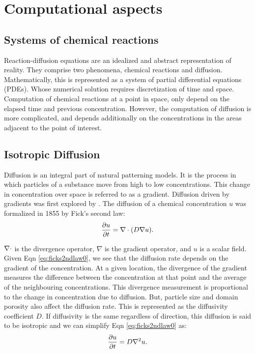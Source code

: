 \newcommand{\Morph}{u}

\chapter{Computational aspects}

\section{Systems of chemical reactions}
Reaction-diffusion equations are an idealized and abstract representation of reality. They comprise two phenomena, chemical reactions and diffusion. Mathematically, this is represented as a system of partial differential equations (PDEs). Whose numerical solution requires discretization of time and space. Computation of chemical reactions at a point in space, only depend on the elapsed time and previous concentration. However, the computation of diffusion is more complicated, and depends additionally on the concentrations in the areas adjacent to the point of interest.

\section{Isotropic Diffusion}
Diffusion is an integral part of natural patterning models. It is the process in which particles of a substance move from high to low concentrations. This change in concentration over space is referred to as a gradient. Diffusion driven by gradients was first explored by \citet{fick1995liquid}. The diffusion of a chemical concentration $\Morph$ was formalized in 1855 by Fick's second law:
\begin{equation}
\label{eq:ficks2ndlaw0}
	\frac{\partial \Morph}{\partial t} = \Div (D \nabla \Morph).
\end{equation}
	
$\nabla \cdot$ is the divergence operator, $\nabla$ is the gradient operator, and $u$ is a scalar field. Given Eqn \ref{eq:ficks2ndlaw0}, we see that the diffusion rate depends on the gradient of the concentration. At a given location, the divergence of the gradient measures the difference between the concentration at that point and the average of the neighbouring concentrations. This divergence measurement is proportional to the change in concentration due to diffusion. But, particle size and domain porosity also affect the diffusion rate. This is represented as the diffusivity coefficient $D$. If diffusivity is the same regardless of direction, this diffusion is said to be isotropic and we can simplify Eqn \ref{eq:ficks2ndlaw0} as:
\begin{equation}
\label{eq:ficks2ndlaw1}
	\frac{\partial \Morph}{\partial t} = D \Lap \Morph.
\end{equation}
	
